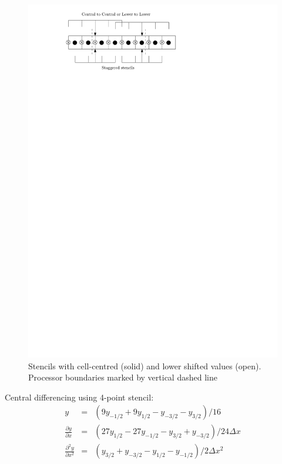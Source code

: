 \documentclass[12pt]{article}
\newcommand{\deriv}[2]{\ensuremath{\frac{\partial #1}{\partial #2}}}
\begin{document}
\begin{figure}[htb!]
\centering
\includegraphics[scale=0.9]{figs/diffStencils.pdf}
\caption{Stencils with cell-centred (solid) and lower shifted values (open). Processor boundaries
marked by vertical dashed line}
\label{fig:diffStencils}
\end{figure}

Central differencing using 4-point stencil:
\begin{eqnarray*}
y &=& \left(9y_{-1/2} + 9y_{1/2} - y_{-3/2} - y_{3/2}\right) / 16 \\
\deriv{y}{x} &=& \left( 27y_{1/2} - 27y_{-1/2} - y_{3/2} + y_{-3/2}\right) / 24\Delta x \\
\frac{\partial^2 y}{\partial x^2} &=& \left(y_{3/2} + y_{-3/2} - y_{1/2} - y_{-1/2}\right) / 2\Delta x^2
\end{eqnarray*}
\end{document}
